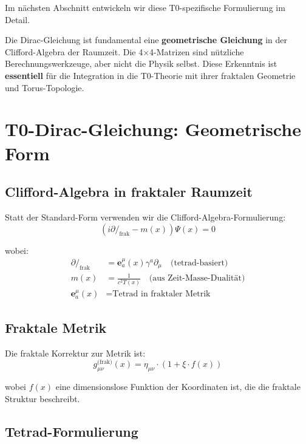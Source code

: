Im nächsten Abschnitt entwickeln wir diese T0-spezifische Formulierung im Detail.

\begin{keypoint}
	Die Dirac-Gleichung ist fundamental eine \textbf{geometrische Gleichung} in der 
	Clifford-Algebra der Raumzeit. Die 4×4-Matrizen sind nützliche 
	Berechnungswerkzeuge, aber nicht die Physik selbst. Diese Erkenntnis ist 
	\textbf{essentiell} für die Integration in die T0-Theorie mit ihrer fraktalen 
	Geometrie und Torus-Topologie.
\end{keypoint}	
	\section{T0-Dirac-Gleichung: Geometrische Form}
	
	\subsection{Clifford-Algebra in fraktaler Raumzeit}
	
	Statt der Standard-Form verwenden wir die Clifford-Algebra-Formulierung:
	\begin{equation}
		\boxed{(i \partial\!\!\!/_{\text{frak}} - m(x))\Psi(x) = 0}
		\label{eq:t0_dirac}
	\end{equation}
	
	wobei:
	\begin{align}
		\partial\!\!\!/_{\text{frak}} &= \mathbf{e}^\mu_a(x) \gamma^a \partial_\mu 
		\quad \text{(tetrad-basiert)} \\
		m(x) &= \frac{1}{c^2 T(x)} \quad \text{(aus Zeit-Masse-Dualität)} \\
		\mathbf{e}^\mu_a(x) &= \text{Tetrad in fraktaler Metrik}
	\end{align}
	
	\subsection{Fraktale Metrik}
	
	Die fraktale Korrektur zur Metrik ist:
	\begin{equation}
		g_{\mu\nu}^{\text{(frak)}}(x) = \eta_{\mu\nu} \cdot \left(1 + \xi \cdot f(x)\right)
		\label{eq:fractal_metric}
	\end{equation}
	
	wobei $f(x)$ eine dimensionslose Funktion der Koordinaten ist, die die fraktale 
	Struktur beschreibt.
	
	\subsection{Tetrad-Formulierung}
	
